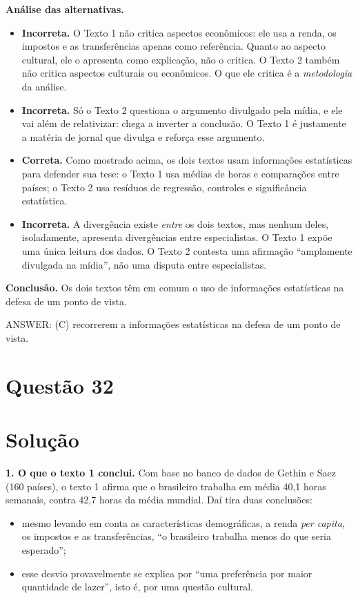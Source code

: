 \documentclass{article}%
\begin{document}
\textbf{Análise das alternativas.}
\begin{itemize}
  \item[a)] \textbf{Incorreta.} O Texto 1 não critica aspectos econômicos: ele usa a renda, os impostos e as transferências apenas como referência. Quanto ao aspecto cultural, ele o apresenta como explicação, não o critica. O Texto 2 também não critica aspectos culturais ou econômicos. O que ele critica é a \emph{metodologia} da análise.
  \item[b)] \textbf{Incorreta.} Só o Texto 2 questiona o argumento divulgado pela mídia, e ele vai além de relativizar: chega a inverter a conclusão. O Texto 1 é justamente a matéria de jornal que divulga e reforça esse argumento.
  \item[c)] \textbf{Correta.} Como mostrado acima, os dois textos usam informações estatísticas para defender sua tese: o Texto 1 usa médias de horas e comparações entre países; o Texto 2 usa resíduos de regressão, controles e significância estatística.
  \item[d)] \textbf{Incorreta.} A divergência existe \emph{entre} os dois textos, mas nenhum deles, isoladamente, apresenta divergências entre especialistas. O Texto 1 expõe uma única leitura dos dados. O Texto 2 contesta uma afirmação ``amplamente divulgada na mídia'', não uma disputa entre especialistas.
\end{itemize}

\textbf{Conclusão.} Os dois textos têm em comum o uso de informações estatísticas na defesa de um ponto de vista.

ANSWER: (C) recorrerem a informações estatísticas na defesa de um ponto de vista.%
\newpage%
\section*{Questão 32}

\section*{Solução}

\textbf{1. O que o texto 1 conclui.} Com base no banco de dados de Gethin e Saez (160 países), o texto 1 afirma que o brasileiro trabalha em média 40,1 horas semanais, contra 42,7 horas da média mundial. Daí tira duas conclusões:
\begin{itemize}
\item mesmo levando em conta as características demográficas, a renda \emph{per capita}, os impostos e as transferências, ``o brasileiro trabalha menos do que seria esperado'';
\item esse desvio provavelmente se explica por ``uma preferência por maior quantidade de lazer'', isto é, por uma questão cultural.
\end{itemize}
\end{document}
